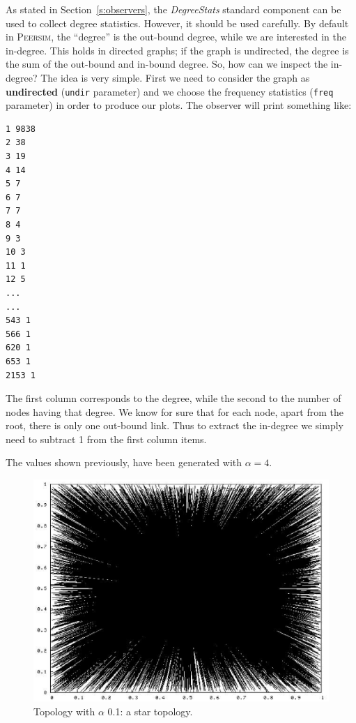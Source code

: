 \documentclass[a4paper,11pt]{article}
\newcommand{\id}[1]{{\scshape\small #1}}
\newcommand{\psim}{\id{Peersim}}
\begin{document}
As stated in Section~\ref{s:observers}, the \emph{DegreeStats} standard
component can be used to collect degree statistics. However, it should 
be used carefully. By default in \psim,
the ``degree'' is the out-bound degree, while we are interested in the
in-degree. This holds in directed graphs; if the graph is undirected,
the degree is the sum of the out-bound and in-bound degree. So, how
can we inspect the in-degree? The idea is very simple. First we need
to consider the graph as \textbf{undirected} (\texttt{undir}
parameter) and we choose the frequency statistics (\texttt{freq}
parameter) in order to produce our plots. The observer will
print something like:

\footnotesize
\begin{verbatim}
1 9838
2 38
3 19
4 14
5 7
6 7
7 7
8 4
9 3
10 3
11 1
12 5
...
...
543 1
566 1
620 1
653 1
2153 1
\end{verbatim}
\normalsize

The first column corresponds to the degree, while the second to the
number of nodes having that degree. We know for sure that for each node, apart from the
root, there is only one out-bound link. Thus to extract the in-degree
we simply need to subtract 1 from the first column items.

The values shown previously, have been generated with $\alpha = 4$. 

\begin{figure}[tb!]
\begin{center}
\includegraphics[scale=0.6]{pic_alfa01.eps}
\end{center}
\caption{Topology with $\alpha$ 0.1: a star topology.\label{t01figure}}
\end{figure}
\end{document}

